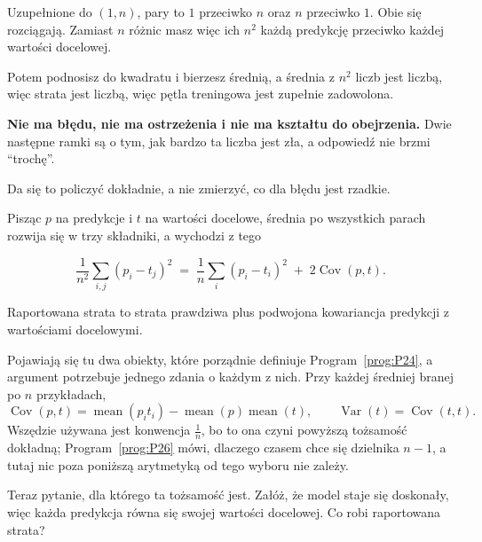 \begin{fr}
Uzupełnione do $(1, n)$, pary to $1$ przeciwko $n$ oraz $n$ przeciwko $1$. Obie
się rozciągają. Zamiast $n$ różnic masz więc ich $n^{2}$ \dash{} każdą predykcję
przeciwko każdej wartości docelowej.

Potem podnosisz do kwadratu i bierzesz średnią, a średnia z $n^{2}$ liczb jest
liczbą, więc strata jest liczbą, więc pętla treningowa jest zupełnie
zadowolona.

\textbf{Nie ma błędu, nie ma ostrzeżenia i nie ma kształtu do obejrzenia.} Dwie
następne ramki są o tym, jak bardzo ta liczba jest zła, a odpowiedź nie brzmi
\enquote{trochę}.
\end{fr}

\begin{fr}
Da się to policzyć dokładnie, a nie zmierzyć, co dla błędu jest rzadkie.

Pisząc $p$ na predykcje i $t$ na wartości docelowe, średnia po wszystkich
parach rozwija się w trzy składniki, a wychodzi z tego

\[ \frac{1}{n^{2}}\sum_{i,j} (p_i - t_j)^{2}
   \;=\; \frac{1}{n}\sum_{i} (p_i - t_i)^{2} \;+\; 2\operatorname{Cov}(p, t). \]

Raportowana strata to strata prawdziwa plus podwojona kowariancja predykcji z
wartościami docelowymi.

\begin{rigourbox}
Pojawiają się tu dwa obiekty, które porządnie definiuje
Program~\ref{prog:P24}, a argument potrzebuje jednego zdania o każdym z nich.
Przy każdej średniej branej po $n$ przykładach,
\[ \operatorname{Cov}(p, t)
   = \operatorname{mean}(p_i t_i)
     - \operatorname{mean}(p)\operatorname{mean}(t),
   \qquad \operatorname{Var}(t) = \operatorname{Cov}(t, t). \]
Wszędzie używana jest konwencja $\frac{1}{n}$, bo to ona czyni powyższą
tożsamość dokładną; Program~\ref{prog:P26} mówi, dlaczego czasem chce się
dzielnika $n - 1$, a tutaj nic poza poniższą arytmetyką od tego wyboru nie
zależy.
\end{rigourbox}

Teraz pytanie, dla którego ta tożsamość jest. Załóż, że model staje się
doskonały, więc każda predykcja równa się swojej wartości docelowej. Co robi
raportowana strata?
\dotline
\nextframe
\end{fr}

